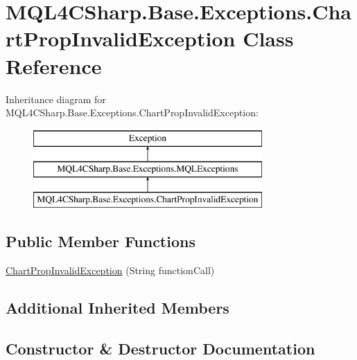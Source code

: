 \hypertarget{class_m_q_l4_c_sharp_1_1_base_1_1_exceptions_1_1_chart_prop_invalid_exception}{}\section{M\+Q\+L4\+C\+Sharp.\+Base.\+Exceptions.\+Chart\+Prop\+Invalid\+Exception Class Reference}
\label{class_m_q_l4_c_sharp_1_1_base_1_1_exceptions_1_1_chart_prop_invalid_exception}
Inheritance diagram for M\+Q\+L4\+C\+Sharp.\+Base.\+Exceptions.\+Chart\+Prop\+Invalid\+Exception\+:\begin{figure}[H]
\begin{center}
\leavevmode
\includegraphics[height=3.000000cm]{class_m_q_l4_c_sharp_1_1_base_1_1_exceptions_1_1_chart_prop_invalid_exception}
\end{center}
\end{figure}
\subsection*{Public Member Functions}
\begin{DoxyCompactItemize}
\item 
\hyperlink{class_m_q_l4_c_sharp_1_1_base_1_1_exceptions_1_1_chart_prop_invalid_exception_af4e77b629501285d3113285c348fca7d}{Chart\+Prop\+Invalid\+Exception} (String function\+Call)
\end{DoxyCompactItemize}
\subsection*{Additional Inherited Members}


\subsection{Constructor \& Destructor Documentation}

